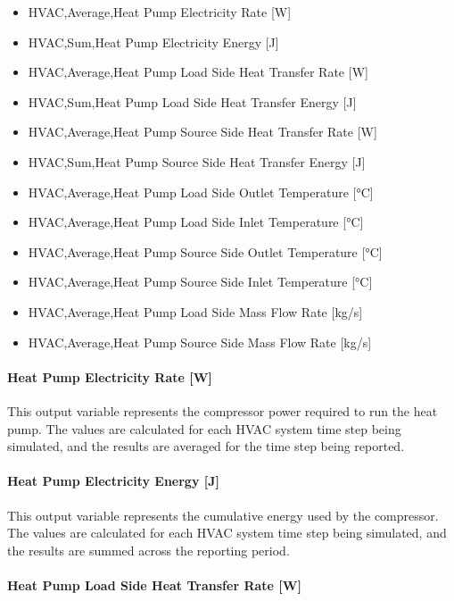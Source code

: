 \begin{itemize}
\item
  HVAC,Average,Heat Pump Electricity Rate {[}W{]}
\item
  HVAC,Sum,Heat Pump Electricity Energy {[}J{]}
\item
  HVAC,Average,Heat Pump Load Side Heat Transfer Rate {[}W{]}
\item
  HVAC,Sum,Heat Pump Load Side Heat Transfer Energy {[}J{]}
\item
  HVAC,Average,Heat Pump Source Side Heat Transfer Rate {[}W{]}
\item
  HVAC,Sum,Heat Pump Source Side Heat Transfer Energy {[}J{]}
\item
  HVAC,Average,Heat Pump Load Side Outlet Temperature {[}°C{]}
\item
  HVAC,Average,Heat Pump Load Side Inlet Temperature {[}°C{]}
\item
  HVAC,Average,Heat Pump Source Side Outlet Temperature {[}°C{]}
\item
  HVAC,Average,Heat Pump Source Side Inlet Temperature {[}°C{]}
\item
  HVAC,Average,Heat Pump Load Side Mass Flow Rate {[}kg/s{]}
\item
  HVAC,Average,Heat Pump Source Side Mass Flow Rate {[}kg/s{]}
\end{itemize}

\paragraph{Heat Pump Electricity Rate {[}W{]}}\label{water-to-water-heat-pump-electric-power-w-1}

This output variable represents the compressor power required to run the heat pump. The values are calculated for each HVAC system time step being simulated, and the results are averaged for the time step being reported.

\paragraph{Heat Pump Electricity Energy {[}J{]}}\label{water-to-water-heat-pump-electric-energy-j-1}

This output variable represents the cumulative energy used by the compressor. The values are calculated for each HVAC system time step being simulated, and the results are summed across the reporting period.

\paragraph{Heat Pump Load Side Heat Transfer Rate {[}W{]}}\label{water-to-water-heat-pump-load-side-heat-transfer-rate-w-1}

